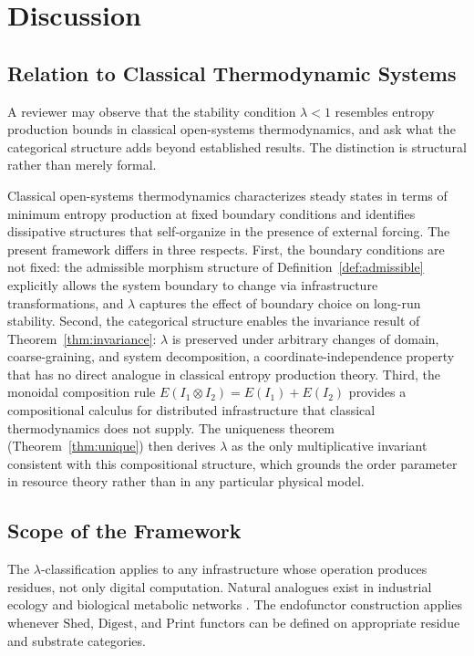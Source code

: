 \documentclass[10pt,twocolumn]{article}
\theoremstyle{plain}
\theoremstyle{definition}
\theoremstyle{remark}
\begin{document}
\section{Discussion}

\subsection{Relation to Classical Thermodynamic Systems}

A reviewer may observe that the stability condition $\lambda < 1$
resembles entropy production bounds in classical open-systems
thermodynamics, and ask what the categorical structure adds beyond
established results. The distinction is structural rather than merely
formal.

Classical open-systems thermodynamics \citep{prigogine1977} characterizes
steady states in terms of minimum entropy production at fixed boundary
conditions and identifies dissipative structures that self-organize
in the presence of external forcing. The present framework differs in
three respects. First, the boundary conditions are not fixed: the
admissible morphism structure of Definition~\ref{def:admissible}
explicitly allows the system boundary to change via infrastructure
transformations, and $\lambda$ captures the effect of boundary choice
on long-run stability. Second, the categorical structure enables the
invariance result of Theorem~\ref{thm:invariance}: $\lambda$ is
preserved under arbitrary changes of domain, coarse-graining, and
system decomposition, a coordinate-independence property that has no
direct analogue in classical entropy production theory. Third, the
monoidal composition rule $E(I_1 \otimes I_2) = E(I_1) + E(I_2)$
provides a compositional calculus for distributed infrastructure that
classical thermodynamics does not supply. The uniqueness theorem
(Theorem~\ref{thm:unique}) then derives $\lambda$ as the only
multiplicative invariant consistent with this compositional structure,
which grounds the order parameter in resource theory rather than in
any particular physical model.

\subsection{Scope of the Framework}

The $\lambda$-classification applies to any infrastructure whose
operation produces residues, not only digital computation. Natural
analogues exist in industrial ecology \citep{georgescu1971,ayres1998}
and biological metabolic networks \citep{kauffman1993,odum1994}. The
endofunctor construction applies whenever $\mathrm{Shed}$,
$\mathrm{Digest}$, and $\mathrm{Print}$ functors can be defined on
appropriate residue and substrate categories.
\end{document}
